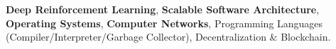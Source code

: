 \textbf{Deep Reinforcement Learning}, \textbf{Scalable Software Architecture}, \textbf{Operating Systems}, \textbf{Computer Networks}, Programming Languages (Compiler/Interpreter/Garbage Collector), Decentralization \& Blockchain.